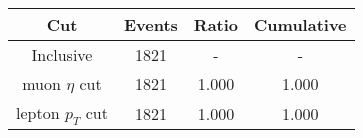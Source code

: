 \begin{tabular}{|c||c|c|c|}
\hline
Cut & Events & Ratio & Cumulative \\\hline
Inclusive & 1821 & - & - \\
muon $\eta$ cut & 1821 & 1.000 & 1.000 \\
lepton $p_{T}$ cut & 1821 & 1.000 & 1.000 \\
\end{tabular}